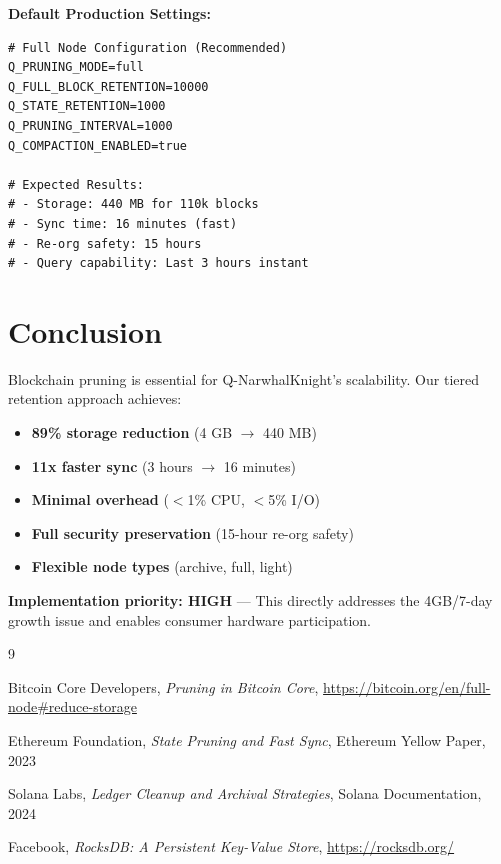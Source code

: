 \documentclass[11pt,a4paper]{article}
\begin{document}
\textbf{Default Production Settings:}

\begin{lstlisting}
# Full Node Configuration (Recommended)
Q_PRUNING_MODE=full
Q_FULL_BLOCK_RETENTION=10000
Q_STATE_RETENTION=1000
Q_PRUNING_INTERVAL=1000
Q_COMPACTION_ENABLED=true

# Expected Results:
# - Storage: 440 MB for 110k blocks
# - Sync time: 16 minutes (fast)
# - Re-org safety: 15 hours
# - Query capability: Last 3 hours instant
\end{lstlisting}

\section{Conclusion}

Blockchain pruning is essential for Q-NarwhalKnight's scalability. Our tiered retention approach achieves:

\begin{itemize}
\item \textbf{89\% storage reduction} (4 GB $\rightarrow$ 440 MB)
\item \textbf{11x faster sync} (3 hours $\rightarrow$ 16 minutes)
\item \textbf{Minimal overhead} ($<$1\% CPU, $<$5\% I/O)
\item \textbf{Full security preservation} (15-hour re-org safety)
\item \textbf{Flexible node types} (archive, full, light)
\end{itemize}

\textbf{Implementation priority: HIGH} — This directly addresses the 4GB/7-day growth issue and enables consumer hardware participation.

\begin{thebibliography}{9}

Bitcoin Core Developers,
\textit{Pruning in Bitcoin Core},
\url{https://bitcoin.org/en/full-node#reduce-storage}

Ethereum Foundation,
\textit{State Pruning and Fast Sync},
Ethereum Yellow Paper, 2023

Solana Labs,
\textit{Ledger Cleanup and Archival Strategies},
Solana Documentation, 2024

Facebook,
\textit{RocksDB: A Persistent Key-Value Store},
\url{https://rocksdb.org/}

\end{thebibliography}
\end{document}

